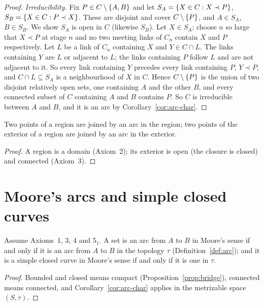\begin{proof}
\emph{Irreducibility.} Fix $P\in C\setminus\left\{ A,B \right\}$ and let $S_A=\left\{ X\in C:X\prec P \right\}$,
$S_B=\left\{ X\in C:P\prec X \right\}$. These are disjoint and cover $C\setminus\left\{ P \right\}$, and $A\in S_A$, $B\in S_B$. We
show $S_A$ is open in $C$ (likewise $S_B$). Let $X\in S_A$; choose $n$ so large that $X\prec P$ at stage $n$
and no two meeting links of $C_n$ contain $X$ and $P$ respectively. Let $L$ be a link of $C_n$ containing $X$
and $Y\in C\cap L$. The links containing $Y$ are $L$ or adjacent to $L$; the links containing $P$ follow $L$
and are not adjacent to it. So every link containing $Y$ precedes every link containing $P$, $Y\prec P$, and
$C\cap L\subseteq S_A$ is a neighbourhood of $X$ in $C$. Hence $C\setminus\left\{ P \right\}$ is the union of two disjoint
relatively open sets, one containing $A$ and the other $B$, and every connected subset of $C$ containing $A$
and $B$ contains $P$. So $C$ is irreducible between $A$ and $B$, and it is an arc by
Corollary~\ref{cor:arc-char}.
\end{proof}


\begin{corollary}[F.A.\ Theorem~16]\label{cor:fa16}
Two points of a region are joined by an arc in the region; two points of the exterior of a region are
joined by an arc in the exterior.
\end{corollary}

\begin{proof}
A region is a domain (Axiom~2); its exterior is open (the closure is closed) and connected (Axiom~3).
\end{proof}


\section{Moore's arcs and simple closed curves}

\begin{proposition}\label{prop:moore-arcs}
Assume Axioms~1, 3, 4 and $5_1$. A set is an arc from $A$ to $B$ in Moore's sense if and only if it is an
arc from $A$ to $B$ in the topology $\tau$ (Definition~\ref{def:arc}); and it is a simple closed curve in
Moore's sense if and only if it is one in $\tau$.
\end{proposition}

\begin{proof}
Bounded and closed means compact (Proposition~\ref{prop:bridge}), connected means connected, and
Corollary~\ref{cor:arc-char} applies in the metrizable space $(S,\tau)$.
\end{proof}

